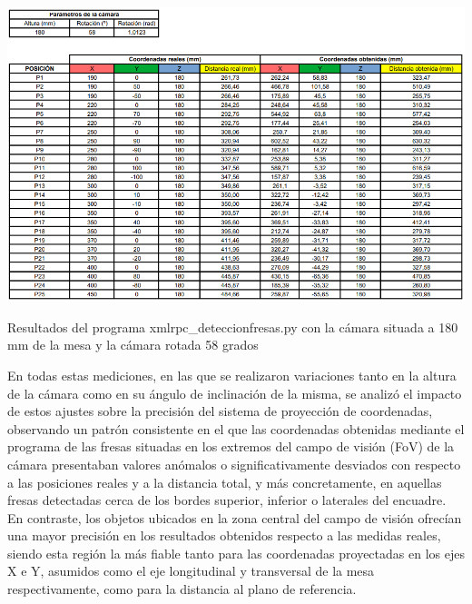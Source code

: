   \begin{table}[H]
     \centering
     \begin{center}
       \includegraphics[width=155mm]{figs/Resultados 180 mm 58 grados.png}
     \end{center}
     \caption{Resultados del programa xmlrpc\_deteccionfresas.py con la cámara situada a 180 mm de la mesa y la cámara rotada 58 grados}
     \label{tab:resultados_180mm_58grados}
  \end{table}

En todas estas mediciones, en las que se realizaron variaciones tanto en la altura de la cámara como en su ángulo de inclinación de la misma, se analizó el impacto de estos ajustes sobre la precisión del sistema de proyección de coordenadas, observando un patrón consistente en el que las coordenadas obtenidas mediante el programa de las fresas situadas en los extremos del campo de visión (FoV) de la cámara presentaban valores anómalos o significativamente desviados con respecto a las posiciones reales y a la distancia total, y más concretamente, en aquellas fresas detectadas cerca de los bordes superior, inferior o laterales del encuadre. En contraste, los objetos ubicados en la zona central del campo de visión ofrecían una mayor precisión en los resultados obtenidos respecto a las medidas reales, siendo esta región la más fiable tanto para las coordenadas proyectadas en los ejes X e Y, asumidos como el eje longitudinal y transversal de la mesa respectivamente, como para la distancia al plano de referencia.\\

